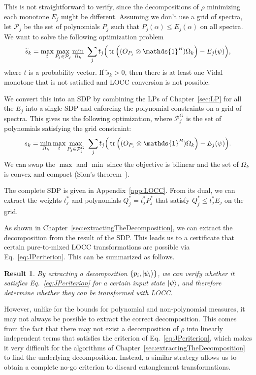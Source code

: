 \documentclass[11pt,a4paper]{report}
\newcommand{\one}{\mathds{1}}
\newcommand{\I}{\one}
\renewcommand{\a}{\alpha}
\newtheorem{result}[theorem]{Result}
\newcounter{reptag}
\newif\iftags \tagsfalse   %
\newcommand{\reptagbox}[3]{\iftags\par\smallskip\noindent\refstepcounter{reptag}%
  \fcolorbox{#1}{#1!7}{\parbox{\dimexpr\linewidth-2\fboxsep-2\fboxrule\relax}{\small
  \textcolor{#1}{\textbf{[\thereptag]\ #2.}}\ #3}}\par\smallskip\fi}
\newcommand{\detail}[1]{\reptagbox{tagD}{More detail}{#1}}
\begin{document}
This is not straightforward to verify, since the decompositions of $\rho$ minimizing each monotone $E_j$ might be different. Assuming we don't use a grid of spectra, let $\mathcal{P}_j$ be the set of polynomials $P_j$ such that $P_j(\a) \leq E_j(\a)$ on all spectra. We want to solve the following optimization problem
\begin{equation}
    \widetilde{s}_k = \max_t\max_{P_j\in\mathcal{P}_j} \min_{\Omega_k} \ \sum_j t_j\Big(\tr\left((O_{P_j}\otimes\I^B)\Omega_k\right)-E_j(\psi)\Big),
\end{equation}
where $t$ is a probability vector. If $\widetilde{s}_k > 0$, then there is at least one Vidal monotone that is not satisfied and LOCC conversion is not possible.

We convert this into an SDP by combining the LPs of Chapter~\ref{sec:LP} for all the $E_j$ into a single SDP and enforcing the polynomial constraints on a grid of spectra.
This gives us the following optimization, where $\mathcal{P}^G_j$ is the set of polynomials satisfying the grid constraint:
\begin{align}\label{eq:LOCCminmaxt}
    s_k=\min_{\Omega_k} \max_t \max_{P_j\in\mathcal{P}^G_j}\ \sum_j t_j\Big(\tr\left((O_{P_j}\otimes\I^B)\Omega_k\right)-E_j(\psi)\Big).
\end{align}
We can swap the $\max$ and $\min$ since the objective is bilinear and the set of $\Omega_k$ is convex and compact (Sion's theorem~\cite{Sion1958}).
\detail{Explain in words why the weights $t_j$ appear: the certificate is a convex combination of the violated inequalities.}
The complete SDP is given in Appendix~\ref{app:LOCC}. From its dual, we can extract the weights $t_j^*$ and polynomials $Q_j^* = t_j^* P_j^*$ that satisfy $Q^*_j\leq t^*_jE_j$ on the grid.

As shown in Chapter~\ref{sec:extractingTheDecomposition}, we can extract the decomposition from the result of the SDP. This leads us to a certificate that certain pure-to-mixed LOCC transformations are possible via Eq.~\eqref{eq:JPcriterion}. This can be summarized as follows.

\begin{result}
By extracting a decomposition $\{p_i, \ket{\psi_i}\}$, we can verify whether it satisfies Eq.~\eqref{eq:JPcriterion} for a certain input state $\ket{\psi}$, and therefore determine whether they can be transformed with LOCC.
\end{result}
However, unlike for the bounds for polynomial and non-polynomial measures, it may not always be possible to extract the correct decomposition. This comes from the fact that there may not exist a decomposition of $\rho$ into linearly independent terms that satisfies the criterion of Eq.~\eqref{eq:JPcriterion}, which makes it very difficult for the algorithms of Chapter~\ref{sec:extractingTheDecomposition} to find the underlying decomposition.
Instead, a similar strategy allows us to obtain a complete no-go criterion to discard entanglement transformations.
\end{document}
